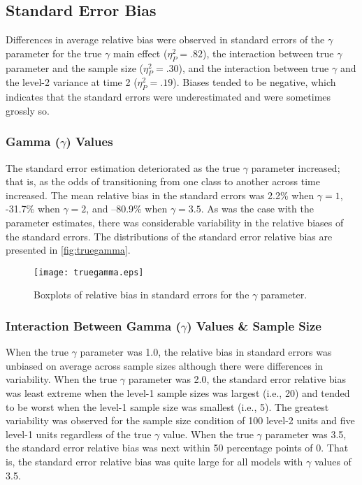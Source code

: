 \documentclass[man, noextraspace, floatsintext, 12pt]{apa7}
\begin{document}
\subsection*{Standard Error Bias}
Differences in average relative bias were observed in standard errors of the $\gamma$ parameter for the true $\gamma$ main effect ($\eta_P^2 = .82$), the interaction between true $\gamma$ parameter and the sample size ($\eta_P^2 = .30$), and the interaction between true $\gamma$ and the level-2 variance at time 2 ($\eta_P^2 = .19$). Biases tended to be negative, which indicates that the standard errors were underestimated and were sometimes grossly so. 

\subsubsection*{Gamma ($\gamma$) Values}
The standard error estimation deteriorated as the true $\gamma$ parameter increased; that is, as the odds of transitioning from one class to another across time increased. The mean relative bias in the standard errors was 2.2\% when $\gamma=1$, -31.7\% when $\gamma=2$, and --80.9\% when $\gamma=3.5$. As was the case with the parameter estimates, there was considerable variability in the relative biases of the standard errors. The distributions of the standard error relative bias are presented in \autoref{fig:truegamma}.

\begin{figure}[ht]
\centering
\texttt{[image: truegamma.eps]}
\caption{Boxplots of relative bias in standard errors for the $\gamma$ parameter.}\label{fig:truegamma}
\end{figure}

\subsubsection*{Interaction Between Gamma ($\gamma$) Values \& Sample Size}
When the true $\gamma$ parameter was 1.0, the relative bias in standard errors was unbiased on average across sample sizes although there were differences in variability. When the true $\gamma$ parameter was 2.0, the standard error relative bias was least extreme when the level-1 sample sizes was largest (i.e., 20) and tended to be worst when the level-1 sample size was smallest (i.e., 5). The greatest variability was observed for the sample size condition of 100 level-2 units and five level-1 units regardless of the true $\gamma$ value. When the true $\gamma$ parameter was 3.5, the standard error relative bias was next within 50 percentage points of 0. That is, the standard error relative bias was quite large for all models with $\gamma$ values of 3.5.
\end{document}
